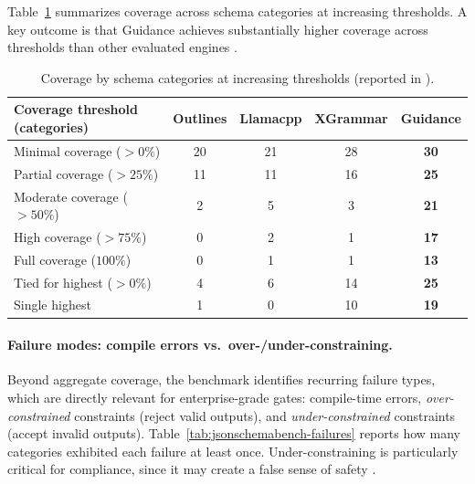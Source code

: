 Table~\ref{tab:jsonschemabench-coverage} summarizes coverage across schema categories at increasing thresholds. A key outcome is that Guidance achieves substantially higher coverage across thresholds than other evaluated engines \cite{geng2025jsonschemabench}.

\begin{table}[t]
\centering
\small
\setlength{\tabcolsep}{6pt}
\renewcommand{\arraystretch}{1.12}
\begin{tabular}{@{}l c c c c@{}}
\toprule
\textbf{Coverage threshold (categories)} & \textbf{Outlines} & \textbf{Llamacpp} & \textbf{XGrammar} & \textbf{Guidance} \\
\midrule
Minimal coverage ($>0\%$)   & 20 & 21 & 28 & \textbf{30} \\
Partial coverage ($>25\%$)  & 11 & 11 & 16 & \textbf{25} \\
Moderate coverage ($>50\%$) &  2 &  5 &  3 & \textbf{21} \\
High coverage ($>75\%$)     &  0 &  2 &  1 & \textbf{17} \\
Full coverage ($100\%$)     &  0 &  1 &  1 & \textbf{13} \\
Tied for highest ($>0\%$)   &  4 &  6 & 14 & \textbf{25} \\
Single highest              &  1 &  0 & 10 & \textbf{19} \\
\bottomrule
\end{tabular}
\caption{Coverage by schema categories at increasing thresholds (reported in \cite{geng2025jsonschemabench}).}
\label{tab:jsonschemabench-coverage}
\end{table}

\paragraph{Failure modes: compile errors vs.\ over-/under-constraining.}
Beyond aggregate coverage, the benchmark identifies recurring failure types, which are directly relevant for enterprise-grade gates: compile-time errors, \emph{over-constrained} constraints (reject valid outputs), and \emph{under-constrained} constraints (accept invalid outputs). Table~\ref{tab:jsonschemabench-failures} reports how many categories exhibited each failure at least once. Under-constraining is particularly critical for compliance, since it may create a false sense of safety \cite{geng2025jsonschemabench}.

